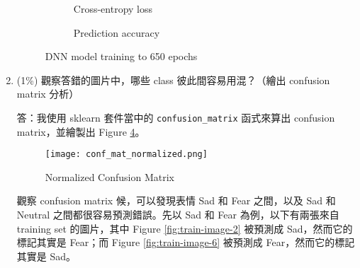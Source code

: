 \documentclass[12pt,a4paper]{extarticle}
\begin{document}
\begin{enumerate}
  \begin{figure}[ht]
    \begin{subfigure}[t]{.5\textwidth}
      \caption{Cross-entropy loss}
      \label{fig:dnn-epoch-loss-650}
    \end{subfigure}
    \begin{subfigure}[t]{.5\textwidth}
      \caption{Prediction accuracy}
      \label{fig:dnn-epoch-acc-650}
    \end{subfigure}
    \caption{DNN model training to 650 epochs}
    \label{fig:dnn-training-650}
  \end{figure}

	\item (1\%) 觀察答錯的圖片中，哪些 class 彼此間容易用混？（繪出 confusion matrix 分析）
	\par 答：我使用 sklearn 套件當中的 \texttt{confusion\_matrix} 函式來算出 confusion matrix，並繪製出 Figure \ref{fig:confusioin-matrix}。

  \begin{figure}[ht]
    \centering
    \texttt{[image: conf\_mat\_normalized.png]}
    \caption{Normalized Confusion Matrix}
    \label{fig:confusioin-matrix}
  \end{figure}

  \par 觀察 confusion matrix 候，可以發現表情 Sad 和 Fear 之間，以及 Sad 和 Neutral 之間都很容易預測錯誤。先以 Sad 和 Fear 為例，以下有兩張來自 training set 的圖片，其中 Figure \ref{fig:train-image-2} 被預測成 Sad，然而它的標記其實是 Fear；而 Figure \ref{fig:train-image-6} 被預測成 Fear，然而它的標記其實是 Sad。


\end{enumerate}
\end{document}
